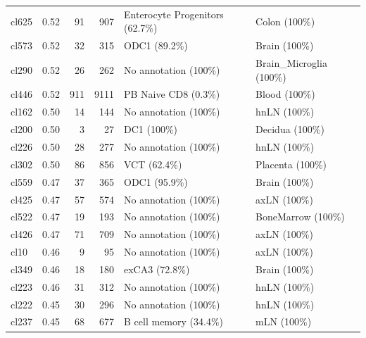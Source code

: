 \begin{table}[ht!]
\begin{tabular}{lrrrll}
  cl625 & 0.52 &  91 & 907 & Enterocyte Progenitors (62.7\%) & Colon (100\%) \\ 
  cl573 & 0.52 &  32 & 315 & ODC1 (89.2\%) & Brain (100\%) \\ 
  cl290 & 0.52 &  26 & 262 & No annotation (100\%) & Brain\_Microglia (100\%) \\ 
  cl446 & 0.52 & 911 & 9111 & PB Naive CD8 (0.3\%) & Blood (100\%) \\ 
  cl162 & 0.50 &  14 & 144 & No annotation (100\%) & hnLN (100\%) \\ 
  cl200 & 0.50 &   3 &  27 & DC1 (100\%) & Decidua (100\%) \\ 
  cl226 & 0.50 &  28 & 277 & No annotation (100\%) & hnLN (100\%) \\ 
  cl302 & 0.50 &  86 & 856 & VCT (62.4\%) & Placenta (100\%) \\ 
  cl559 & 0.47 &  37 & 365 & ODC1 (95.9\%) & Brain (100\%) \\ 
  cl425 & 0.47 &  57 & 574 & No annotation (100\%) & axLN (100\%) \\ 
  cl522 & 0.47 &  19 & 193 & No annotation (100\%) & BoneMarrow (100\%) \\ 
  cl426 & 0.47 &  71 & 709 & No annotation (100\%) & axLN (100\%) \\ 
  cl10 & 0.46 &   9 &  95 & No annotation (100\%) & axLN (100\%) \\ 
  cl349 & 0.46 &  18 & 180 & exCA3 (72.8\%) & Brain (100\%) \\ 
  cl223 & 0.46 &  31 & 312 & No annotation (100\%) & hnLN (100\%) \\ 
  cl222 & 0.45 &  30 & 296 & No annotation (100\%) & hnLN (100\%) \\ 
  cl237 & 0.45 &  68 & 677 & B cell memory (34.4\%) & mLN (100\%) \\ 
   \bottomrule
\end{tabular}
\end{table}


